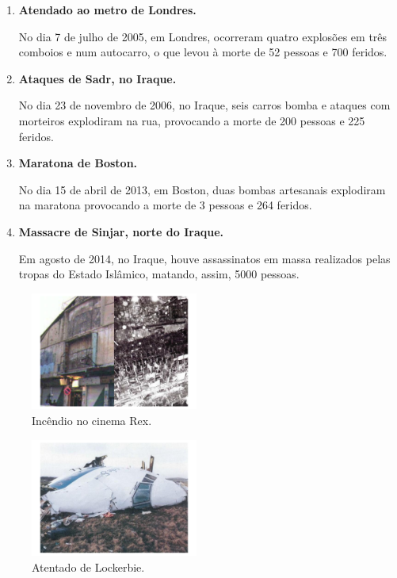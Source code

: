\documentclass{report}
\begin{document}
\begin{enumerate}
 \item \textbf{Atendado ao metro de Londres.}
 
No dia 7 de julho de 2005, em Londres, ocorreram quatro explosões em três comboios e num autocarro, o que levou à morte de 52 pessoas e 700 feridos.
\\
 
 \item \textbf{Ataques de Sadr, no Iraque.}
 
No dia 23 de novembro de 2006, no Iraque, seis carros bomba e ataques com morteiros explodiram na rua, provocando a morte de 200 pessoas e 225 feridos.
\\
 
 \item \textbf{Maratona de Boston.}
 
No dia 15 de abril de 2013, em Boston, duas bombas artesanais explodiram na maratona provocando a morte de 3 pessoas e 264 feridos. 
\\

 \item \textbf{Massacre de Sinjar, norte do Iraque.}
 
Em agosto de 2014, no Iraque, houve assassinatos em massa realizados pelas tropas do Estado Islâmico, matando, assim, 5000 pessoas.
\\ 
\end{enumerate}

\begin{figure}[h]
 \center
 \includegraphics[height=110pt]{imagem1.pdf}
 \caption{Incêndio no cinema Rex.}
 \end{figure}

 \begin{figure}[h]
 \center
 \includegraphics[height=110pt]{imagem2.pdf}
 \caption{Atentado de Lockerbie.}
 \end{figure}
\end{document}
